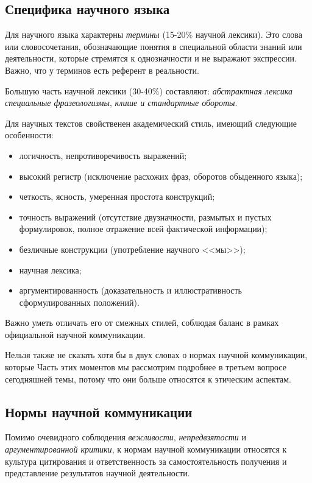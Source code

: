 \subsection{Специфика научного языка}

Для научного языка характерны \textit{термины} (15-20\% научной лексики). Это слова или словосочетания, обозначающие понятия в специальной
области знаний или деятельности, которые стремятся к однозначности и не выражают
экспрессии. Важно, что у терминов есть референт в реальности. 

Большую часть научной лексики (30-40\%) составляют: \textit{абстрактная лексика}
\textit{специальные фразеологизмы}, \textit{клише и стандартные обороты}.

Для научных текстов свойственен академический стиль, имеющий следующие особенности:
\begin{itemize}
    \item логичность, непротиворечивость выражений;
    \item высокий регистр (исключение расхожих фраз, оборотов обыденного языка);
    \item четкость, ясность, умеренная простота конструкций;
    \item точность выражений (отсутствие двузначности, размытых и
    пустых формулировок, полное отражение всей фактической информации);
    \item безличные конструкции (употребление научного <<мы>>);
    \item научная лексика;
    \item аргументированность (доказательность и иллюстративность сформулированных
    положений).
\end{itemize}
Важно уметь отличать его от смежных стилей, соблюдая баланс в рамках официальной научной коммуникации. 

Нельзя также не сказать хотя бы в двух словах о нормах
научной коммуникации, которые  Часть этих моментов мы
рассмотрим подробнее в третьем вопросе сегодняшней темы, потому что они больше
относятся к этическим аспектам. 

\subsection{Нормы научной коммуникации}

Помимо очевидного соблюдения \textit{вежливости},
\textit{непредвзятости} и \textit{аргументированной критики}, к нормам научной коммуникации относятся к культура
цитирования и ответственность за самостоятельность получения и
представление результатов научной деятельности.

